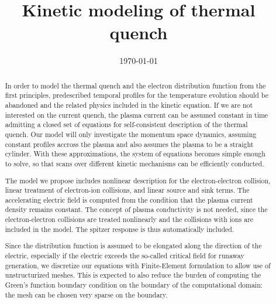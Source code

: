 \documentclass[preprint]{revtex4}
\begin{document}
\title{Kinetic modeling of thermal quench}

\date{\today}

\begin{abstract}
In order to model the thermal quench and the electron distribution function from the first principles, predescribed temporal profiles for the temperature evolution should be abandoned and the related physics included in the kinetic equation. If we are not interested on the current quench, the plasma current can be assumed constant in time admitting a closed set of equations for self-consistent description of the thermal quench. Our model will only investigate the momentum space dynamics, assuming constant profiles accross the plasma and also assumes the plasma to be a straight cylinder. With these approximations, the system of equations becomes simple enough to solve, so that scans over different kinetic mechanisms can be efficiently conducted. 

The model we propose includes nonlinear description for the electron-electron collision, linear treatment of electron-ion collisions, and linear source and sink terms. The accelerating electric field is computed from the condition that the plasma current density remains constant. The concept of plasma conductivity is not needed, since the electron-electron collisions are treated nonlinearly and the collisions with ions are included in the model. The spitzer response is thus automatically included.

Since the distribution function is assumed to be elongated along the direction of the electric, especially if the electric exceeds the so-called critical field for runaway generation, we discretize our equations with Finite-Element formulation to allow use of unstructurized meshes. This is expected to also reduce the burden of computing the Green's function boundary condition on the boundary of the computational domain: the mesh can be chosen very sparse on the boundary.
\end{abstract}


\maketitle
\end{document}
